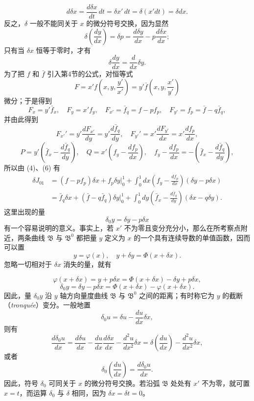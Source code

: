 \documentclass[11pt,a4paper,leqno]{article}
\begin{document}
\[
d\delta x=\frac{d\delta x}{dt}\,dt=\delta x'\,dt=\delta(x'dt)=\delta dx.
\]
反之，\(\delta\) 一般不能同关于 \(x\) 的微分符号交换，因为显然
\[
\delta\left(\frac{dy}{dx}\right)=\delta p=\frac{d\delta y}{dx}-p\frac{d\delta x}{dx};
\]
只有当 \(\delta x\) 恒等于零时，才有
\[
\delta\frac{dy}{dx}=\frac{d}{dx}\delta y.
\]
为了把 \(f\) 和 \(\bar f\) 引入第4节的公式，对恒等式
\[
F=x'f\left(x,y,\frac{y'}{x'}\right)=y'\bar f\left(x,y,\frac{x'}{y'}\right)
\]
微分；于是得到
\[
F_x=y'\bar f_x,\quad F_y=x'f_y,\quad F_{x'}=\bar f_q=f-pf_p,\quad F_{y'}=f_p=\bar f-q\bar f_q,
\]
并由此得到
\[
F_{x'}'=y'\frac{dF_{x'}}{dy}=y'\frac{d\bar f_q}{dy},\quad
F_{y'}'=x'\frac{dF_{y'}}{dx}=x'\frac{df_p}{dx},
\]
\[
P=y'\left(\bar f_x-\frac{d\bar f_q}{dy}\right),\quad
Q=x'\left(f_y-\frac{df_p}{dx}\right),\quad
f_y-\frac{df_p}{dx}=-\left(\bar f_x-\frac{d\bar f_q}{dy}\right),
\]
所以由 (4)、(6) 有
\[
\begin{aligned}
\delta J_{01}&=(f-pf_p)\delta x+f_p\delta y\bigg|_0^1+\int_0^1dx\left(f_y-\frac{df_p}{dx}\right)(\delta y-p\delta x)\\
&=\bar f_q\delta x+(\bar f-q\bar f_q)\delta y\bigg|_0^1+\int_0^1dy\left(\bar f_x-\frac{d\bar f_q}{dy}\right)(\delta x-q\delta y).
\end{aligned}
\]
这里出现的量
\[
\delta_0y=\delta y-p\delta x
\]
有一个容易说明的意义。事实上，若 \(x'\) 不为零且变分充分小，那么在所考察点附近，两条曲线 \(\mathfrak B\) 与 \(\mathfrak B^0\) 都把量 \(y\) 定义为 \(x\) 的一个具有连续导数的单值函数，因而可以置
\[
y=\varphi(x),\quad y+\delta y=\Phi(x+\delta x).
\]
忽略一切相对于 \(\delta x\) 消失的量，就有

\[
\varphi(x+\delta x)=y+p\delta x=\Phi(x+\delta x)-\delta y+p\delta x,
\]
\[
\delta_0y=\delta y-p\delta x=\Phi(x+\delta x)-\varphi(x+\delta x).
\]
因此，量 \(\delta_0y\) 沿 \(y\) 轴方向量度曲线 \(\mathfrak B\) 与 \(\mathfrak B^0\) 之间的距离；有时称它为 \(y\) 的截断（\textit{tronquée}）变分。一般地置
\[
\delta_0u=\delta u-\frac{du}{dx}\delta x,
\]
则有
\[
\frac{d\delta_0u}{dx}=\frac{d\delta u}{dx}-\frac{du}{dx}\frac{d\delta x}{dx}-\frac{d^2u}{dx^2}\delta x
=\delta\left(\frac{du}{dx}\right)-\frac{d^2u}{dx^2}\delta x,
\]
或者
\[
\delta_0\left(\frac{du}{dx}\right)=\frac{d\delta_0u}{dx}.
\]
因此，符号 \(\delta_0\) 可同关于 \(x\) 的微分符号交换。若沿弧 \(\mathfrak B\) 处处有 \(x'\) 不为零，就可置 \(x=t\)，而运算 \(\delta_0\) 与 \(\delta\) 相同，因为 \(\delta x=\delta t=0\)。
\end{document}
